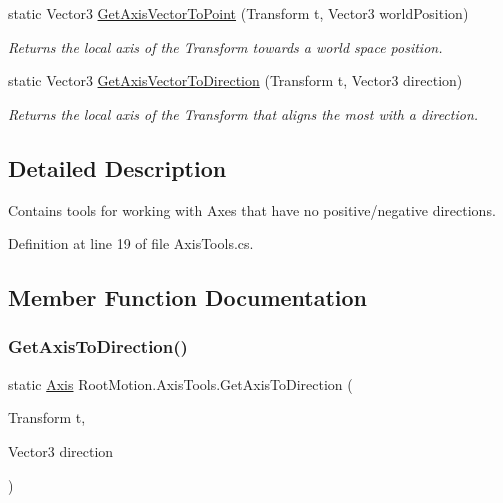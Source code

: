 \begin{DoxyCompactItemize}
static Vector3 \mbox{\hyperlink{class_root_motion_1_1_axis_tools_aff4deb6c334be7a49541ab78100aa813}{Get\+Axis\+Vector\+To\+Point}} (Transform t, Vector3 world\+Position)
\begin{DoxyCompactList}\small\item\em Returns the local axis of the Transform towards a world space position. \end{DoxyCompactList}\item 
static Vector3 \mbox{\hyperlink{class_root_motion_1_1_axis_tools_adf6c7598897f860d50a61d176bd03a7d}{Get\+Axis\+Vector\+To\+Direction}} (Transform t, Vector3 direction)
\begin{DoxyCompactList}\small\item\em Returns the local axis of the Transform that aligns the most with a direction. \end{DoxyCompactList}\end{DoxyCompactItemize}


\subsection{Detailed Description}
Contains tools for working with Axes that have no positive/negative directions. 



Definition at line 19 of file Axis\+Tools.\+cs.



\subsection{Member Function Documentation}
\mbox{\label{class_root_motion_1_1_axis_tools_a97b9cc0aab4dc328fc2745b2d556cfa0}} 
\subsubsection{\texorpdfstring{Get\+Axis\+To\+Direction()}{GetAxisToDirection()}}
{\footnotesize\ttfamily static \mbox{\hyperlink{namespace_root_motion_a824e68ffa644559736d5e0bc80919a87}{Axis}} Root\+Motion.\+Axis\+Tools.\+Get\+Axis\+To\+Direction (\begin{DoxyParamCaption}\item[{Transform}]{t,  }\item[{Vector3}]{direction }\end{DoxyParamCaption})\hspace{0.3cm}{\ttfamily [static]}}



